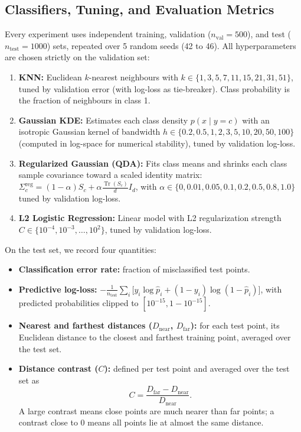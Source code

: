\documentclass[11pt, a4paper]{article}
\begin{document}
\subsection{Classifiers, Tuning, and Evaluation Metrics}
Every experiment uses independent training, validation ($n_{\text{val}} = 500$), and test ($n_{\text{test}} = 1000$) sets, repeated over 5 random seeds (42 to 46). All hyperparameters are chosen strictly on the validation set:
\begin{enumerate}
    \item \textbf{KNN:} Euclidean $k$-nearest neighbours with $k \in \{1, 3, 5, 7, 11, 15, 21, 31, 51\}$, tuned by validation error (with log-loss as tie-breaker). Class probability is the fraction of neighbours in class 1.
    \item \textbf{Gaussian KDE:} Estimates each class density $p(x \mid y=c)$ with an isotropic Gaussian kernel of bandwidth $h \in \{0.2, 0.5, 1, 2, 3, 5, 10, 20, 50, 100\}$ (computed in log-space for numerical stability), tuned by validation log-loss.
    \item \textbf{Regularized Gaussian (QDA):} Fits class means and shrinks each class sample covariance toward a scaled identity matrix: $\Sigma_c^{\text{reg}} = (1-\alpha) S_c + \alpha \frac{\operatorname{Tr}(S_c)}{d} I_d$, with $\alpha \in \{0, 0.01, 0.05, 0.1, 0.2, 0.5, 0.8, 1.0\}$ tuned by validation log-loss.
    \item \textbf{L2 Logistic Regression:} Linear model with L2 regularization strength $C \in \{10^{-4}, 10^{-3}, \dots, 10^2\}$, tuned by validation log-loss.
\end{enumerate}

On the test set, we record four quantities:
\begin{itemize}
    \item \textbf{Classification error rate:} fraction of misclassified test points.
    \item \textbf{Predictive log-loss:} $-\frac{1}{n_{\text{test}}} \sum_i \big[y_i \log \hat{p}_i + (1-y_i)\log(1-\hat{p}_i)\big]$, with predicted probabilities clipped to $[10^{-15}, 1-10^{-15}]$.
    \item \textbf{Nearest and farthest distances ($D_{\text{near}}$, $D_{\text{far}}$):} for each test point, its Euclidean distance to the closest and farthest training point, averaged over the test set.
    \item \textbf{Distance contrast ($C$):} defined per test point and averaged over the test set as
    \[
        C = \frac{D_{\text{far}} - D_{\text{near}}}{D_{\text{near}}}.
    \]
    A large contrast means close points are much nearer than far points; a contrast close to 0 means all points lie at almost the same distance.
\end{itemize}
\end{document}
